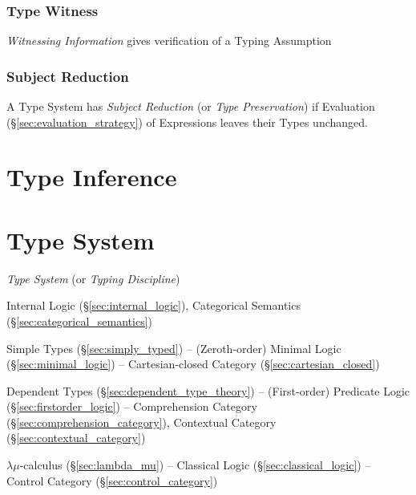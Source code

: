 \subsubsection{Type Witness}\label{sec:type_witness}

\emph{Witnessing Information} gives verification of a Typing
Assumption



\subsubsection{Subject Reduction}\label{sec:subject_reduction}

A Type System has \emph{Subject Reduction} (or \emph{Type
  Preservation}) if Evaluation (\S\ref{sec:evaluation_strategy}) of
Expressions leaves their Types unchanged.



\section{Type Inference}\label{sec:type_inference}

\section{Type System}\label{sec:type_system}

\emph{Type System} (or \emph{Typing Discipline})

Internal Logic (\S\ref{sec:internal_logic}), Categorical Semantics
(\S\ref{sec:categorical_semantics})

Simple Types (\S\ref{sec:simply_typed}) -- (Zeroth-order) Minimal
Logic (\S\ref{sec:minimal_logic}) -- Cartesian-closed Category
(\S\ref{sec:cartesian_closed})

Dependent Types (\S\ref{sec:dependent_type_theory}) -- (First-order)
Predicate Logic (\S\ref{sec:firstorder_logic}) -- Comprehension
Category (\S\ref{sec:comprehension_category}), Contextual Category
(\S\ref{sec:contextual_category})

$\lambda\mu$-calculus (\S\ref{sec:lambda_mu}) -- Classical Logic
(\S\ref{sec:classical_logic}) -- Control Category
(\S\ref{sec:control_category})

